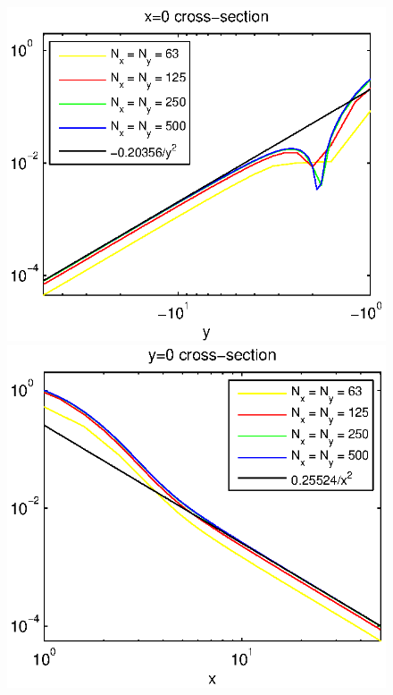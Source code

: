 \documentclass[12pt]{article}
\theoremstyle{theorem}
\theoremstyle{defi}
\begin{document}
\begin{figure}[ht]
	\begin{minipage}[b]{0.5\linewidth}
		\raggedleft
		\includegraphics[width=\linewidth]{crossSectionLogX=0.eps}
	\end{minipage}	
	\begin{minipage}[b]{0.5\linewidth}
		\raggedright
		 \includegraphics[width=\linewidth]{crossSectionLogY=0.eps}

\end{minipage}
\end{figure}
\end{document}
